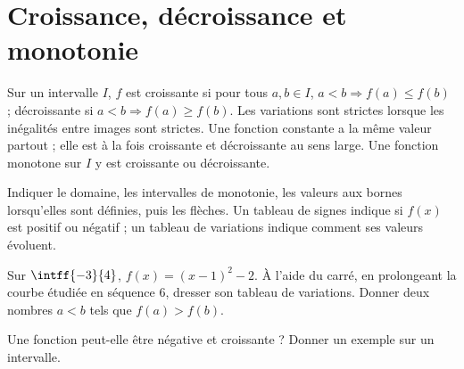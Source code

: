 \section{Croissance, décroissance et monotonie}
\begin{keypoint}[Définitions]
Sur un intervalle $I$, $f$ est croissante si pour tous $a,b\in I$, $a<b\Rightarrow f(a)\leq f(b)$ ; décroissante si $a<b\Rightarrow f(a)\geq f(b)$. Les variations sont strictes lorsque les inégalités entre images sont strictes. Une fonction constante a la même valeur partout ; elle est à la fois croissante et décroissante au sens large.
Une fonction monotone sur $I$ y est croissante ou décroissante.
\end{keypoint}
\begin{method}
Indiquer le domaine, les intervalles de monotonie, les valeurs aux bornes lorsqu'elles sont définies, puis les flèches. Un tableau de signes indique si $f(x)$ est positif ou négatif ; un tableau de variations indique comment ses valeurs évoluent.
\end{method}
\begin{example}Sur $\intff{-3}{4}$, $f(x)=(x-1)^2-2$. À l'aide du carré, en prolongeant la courbe étudiée en séquence 6, dresser son tableau de variations. Donner deux nombres $a<b$ tels que $f(a)>f(b)$.\end{example}
\begin{example}Une fonction peut-elle être négative et croissante ? Donner un exemple sur un intervalle.\end{example}

